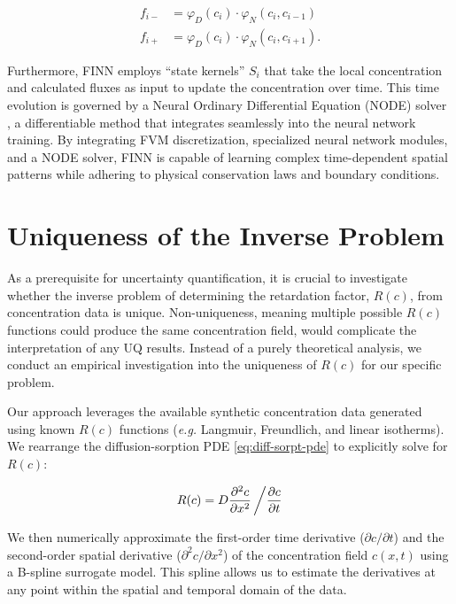 \begin{align*}
    f_{i-} &= \varphi_D(c_i) \cdot \varphi_N(c_i, c_{i-1}) \\
    f_{i+} &= \varphi_D(c_i) \cdot \varphi_N(c_i, c_{i+1}).
\end{align*}

Furthermore, FINN employs ``state kernels'' $S_i$ that take the local concentration and calculated fluxes as input to update the concentration over time. This time evolution is governed by a Neural Ordinary Differential Equation (NODE) solver \cite{chen2019neuralordinarydifferentialequations}, a differentiable method that integrates seamlessly into the neural network training. By integrating FVM discretization, specialized neural network modules, and a NODE solver, FINN is capable of learning complex time-dependent spatial patterns while adhering to physical conservation laws and boundary conditions.



\section{Uniqueness of the Inverse Problem}
\label{sec:uniqueness}

As a prerequisite for uncertainty quantification, it is crucial to investigate whether the inverse problem of determining the retardation factor, $R(c)$, from concentration data is unique. Non-uniqueness, meaning multiple possible $R(c)$ functions could produce the same concentration field, would complicate the interpretation of any UQ results. Instead of a purely theoretical analysis, we conduct an empirical investigation into the uniqueness of $R(c)$ for our specific problem.

Our approach leverages the available synthetic concentration data generated using known $R(c)$ functions (\emph{e.g.} Langmuir, Freundlich, and linear isotherms). We rearrange the diffusion-sorption PDE \ref{eq:diff-sorpt-pde} to explicitly solve for $R(c)$:

\begin{equation}
    R(c) = D \frac{\partial^2 c}{\partial x^2} \left/ \frac{\partial c}{\partial t} \right .
    \label{eq:rearranged_pde}
\end{equation}

We then numerically approximate the first-order time derivative ($\partial c / \partial t$) and the second-order spatial derivative ($\partial^2 c / \partial x^2$) of the concentration field $c(x,t)$ using a B-spline surrogate model. This spline allows us to estimate the derivatives at any point within the spatial and temporal domain of the data.

